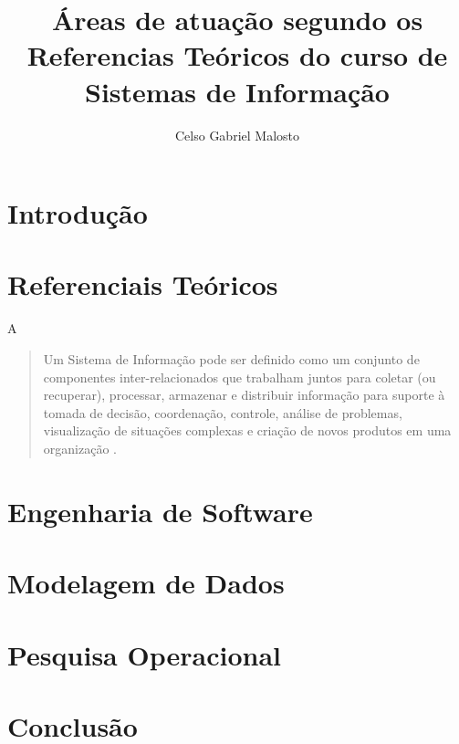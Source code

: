 \documentclass[12pt]{article}
\title{Áreas de atuação segundo os Referencias Teóricos do curso de Sistemas de Informação}
\author{Celso Gabriel Malosto\inst{1}}
\begin{document}
\maketitle

\begin{abstract}

\end{abstract}

\begin{resumo}

\end{resumo}

\section{Introdução}%
\label{sec:introducao}

\section{Referenciais Teóricos}%
\label{sec:referenciais_teoricos}

A 


\begin{quotation}
    Um Sistema de Informação pode ser definido como um conjunto de componentes
    inter-relacionados que trabalham juntos para coletar (ou recuperar), processar, armazenar e distribuir
    informação para suporte à tomada de decisão, coordenação, controle, análise de problemas, visualização de
    situações complexas e criação de novos produtos em uma organização .
\end{quotation}



\section{Engenharia de Software}%
\label{sec:engenharia_de_software}

\section{Modelagem de Dados}%
\label{sec:modelagem_de_dados}

\section{Pesquisa Operacional}%
\label{sec:pesquisa_operacional}

\section{Conclusão}%
\label{sec:conclusao}

\printbibliography{}
\end{document}
